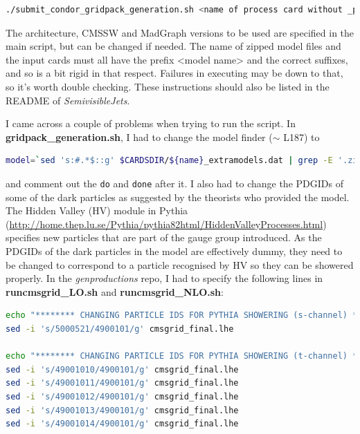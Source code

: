 \begin{lstlisting}[belowskip=-0.7cm, language=sh, numbers=none]
./submit_condor_gridpack_generation.sh <name of process card without _proc_card.dat> <relative path to cards directory> 
\end{lstlisting}

The architecture, CMSSW and MadGraph versions to be used are specified in the main script, but can be changed if needed. The name of zipped model files and the input cards must all have the prefix <model name> and the correct suffixes, and so is a bit rigid in that respect. Failures in executing may be down to that, so it's worth double checking. These instructions should also be listed in the README of \emph{SemivisibleJets}.

I came across a couple of problems when trying to run the script. In \textbf{gridpack\_generation.sh}, I had to change the model finder ($\sim$ L187) to

\begin{lstlisting}[belowskip=-0.7cm, language=sh, numbers=none]
model=`sed 's:#.*$::g' $CARDSDIR/${name}_extramodels.dat | grep -E '.zip|.tar|.tgz' $CARDSDIR/${name}_extramodels.dat`
\end{lstlisting}

and comment out the \texttt{do} and \texttt{done} after it. I also had to change the PDGIDs of some of the dark particles as suggested by the theorists who provided the model. The Hidden Valley (HV) module in Pythia (\url{http://home.thep.lu.se/Pythia/pythia82html/HiddenValleyProcesses.html}) specifies new particles that are part of the gauge group introduced. As the PDGIDs of the dark particles in the model are effectively dummy, they need to be changed to correspond to a particle recognised by HV so they can be showered properly. In the \emph{genproductions} repo, I had to specify the following lines in \textbf{runcmsgrid\_LO.sh} and \textbf{runcmsgrid\_NLO.sh}:

\begin{lstlisting}[belowskip=-0.7cm, language=sh]
echo "******** CHANGING PARTICLE IDS FOR PYTHIA SHOWERING (s-channel) ********"
sed -i 's/5000521/4900101/g' cmsgrid_final.lhe

echo "******** CHANGING PARTICLE IDS FOR PYTHIA SHOWERING (t-channel) ********"
sed -i 's/49001010/4900101/g' cmsgrid_final.lhe
sed -i 's/49001011/4900101/g' cmsgrid_final.lhe
sed -i 's/49001012/4900101/g' cmsgrid_final.lhe
sed -i 's/49001013/4900101/g' cmsgrid_final.lhe
sed -i 's/49001014/4900101/g' cmsgrid_final.lhe
\end{lstlisting}

